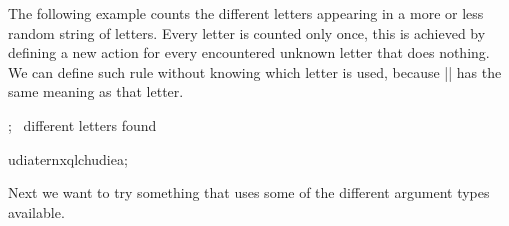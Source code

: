 The following example counts the different letters appearing in a more or less
random string of letters. Every letter is counted only once, this is achieved
by defining a new action for every encountered unknown letter that does
nothing. We can define such rule without knowing which letter is used, because
|\pgfparsertoken| has the same meaning as that letter.
%
\begin{codeexample}[]
;{}%
%
  {\pgfparsertoken{}\advance{}}%
%
  {\the\mycount\ different letters found}%
%

udiaternxqlchudiea;
\end{codeexample}%

Next we want to try something that uses some of the different argument types
available.
%
%
